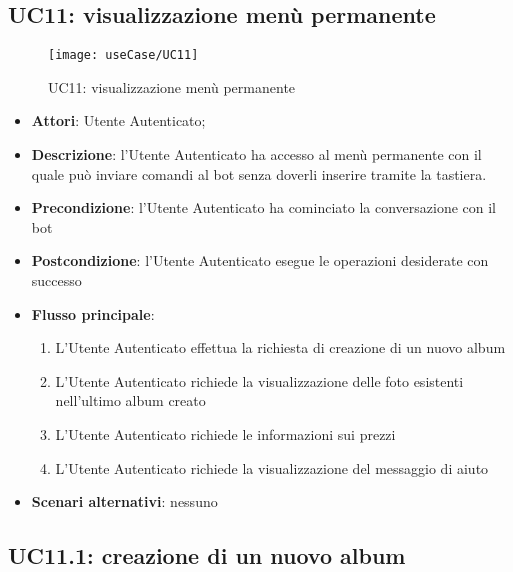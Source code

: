 \newpage

\subsection{UC11: visualizzazione menù permanente}
\label{uc:uc11}

\begin{figure}[H]
  \centering
  \texttt{[image: useCase/UC11]}
  \caption{UC11: visualizzazione menù permanente}
\end{figure}

\begin{itemize}
  \item \textbf{Attori}: Utente Autenticato;
  \item \textbf{Descrizione}: l'Utente Autenticato ha accesso al menù
permanente con il quale può inviare comandi al bot senza doverli inserire
tramite la tastiera.
  \item \textbf{Precondizione}: l'Utente Autenticato ha cominciato la
conversazione con il bot
  \item \textbf{Postcondizione}: l'Utente Autenticato esegue le operazioni
desiderate con successo
  \item \textbf{Flusso principale}:
  \begin{enumerate}
    \item L'Utente Autenticato effettua la richiesta di creazione di un nuovo
album
    \item L'Utente Autenticato richiede la visualizzazione delle foto esistenti
nell'ultimo album creato
    \item L'Utente Autenticato richiede le informazioni sui prezzi
    \item L'Utente Autenticato richiede la visualizzazione del messaggio di
aiuto
  \end{enumerate}
  \item \textbf{Scenari alternativi}: nessuno
\end{itemize}



\subsection{UC11.1: creazione di un nuovo album}
\label{uc:uc11.1}


